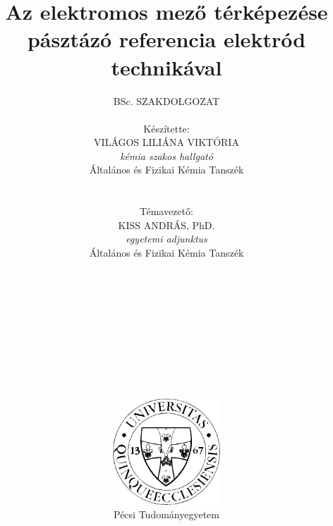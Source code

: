 \pagestyle{empty}

\title{\textbf{Az elektromos mező térképezése pásztázó referencia elektród technikával}}

\author{BSc. SZAKDOLGOZAT\\
\\ Készítette:\\ 
VILÁGOS LILIÁNA VIKTÓRIA \\
\emph{kémia szakos hallgató}\\
Általános és Fizikai Kémia Tanszék \\
\\ \\
Témavezető: \\
KISS ANDRÁS, PhD. \\
\emph{egyetemi adjunktus} \\
Általános és Fizikai Kémia Tanszék \\
\\ \\ \\ \\ \\ \\ \\ \\ \\ \\
\includegraphics[width=0.3\textwidth]{img/pte_logo.eps} \\ Pécsi Tudományegyetem}

\maketitle
\pagestyle{plain}

\large
\setcounter{tocdepth}{4}
\tableofcontents
